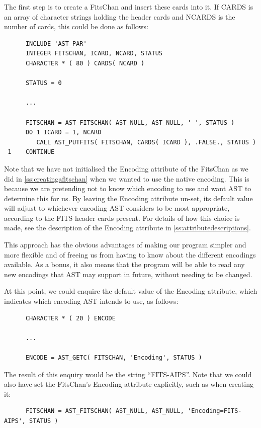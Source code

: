 \documentclass[twoside,11pt]{article}
\newcommand{\htmlref}[2]{#1}
\newcommand{\appref}[1]{Appendix~\ref{#1}}
\newcommand{\secref}[1]{\S\ref{#1}}
\renewcommand{\appref}[1]{\ref{#1}}
\renewcommand{\secref}[1]{\ref{#1}}
\begin{document}
The first step is to create a \htmlref{FitsChan}{FitsChan} and insert these cards into
it. If CARDS is an array of character strings holding the header cards
and NCARDS is the number of cards, this could be done as follows:

\small
\begin{verbatim}
      INCLUDE 'AST_PAR'
      INTEGER FITSCHAN, ICARD, NCARD, STATUS
      CHARACTER * ( 80 ) CARDS( NCARD )

      STATUS = 0

      ...

      FITSCHAN = AST_FITSCHAN( AST_NULL, AST_NULL, ' ', STATUS )
      DO 1 ICARD = 1, NCARD
         CALL AST_PUTFITS( FITSCHAN, CARDS( ICARD ), .FALSE., STATUS )
 1    CONTINUE
\end{verbatim}
\normalsize

Note that we have not initialised the \htmlref{Encoding}{Encoding} attribute of the
FitsChan as we did in \secref{ss:creatingafitschan} when we wanted to
use the native encoding. This is because we are pretending not to know
which encoding to use and want AST to determine this for us. By
leaving the Encoding attribute un-set, its default value will adjust
to whichever encoding AST considers to be most appropriate, according
to the FITS header cards present. For details of how this choice is
made, see the description of the Encoding attribute in
\appref{ss:attributedescriptions}.

This approach has the obvious advantages of making our program simpler
and more flexible and of freeing us from having to know about the
different encodings available. As a bonus, it also means that the
program will be able to read any new encodings that AST may support in
future, without needing to be changed.

At this point, we could enquire the default value of the Encoding
attribute, which indicates which encoding AST intends to use, as
follows:

\small
\begin{verbatim}
      CHARACTER * ( 20 ) ENCODE

      ...

      ENCODE = AST_GETC( FITSCHAN, 'Encoding', STATUS )
\end{verbatim}
\normalsize

The result of this enquiry would be the string ``FITS-AIPS''.  Note
that we could also have set the FitsChan's Encoding attribute
explicitly, such as when creating it:

\small
\begin{verbatim}
      FITSCHAN = AST_FITSCHAN( AST_NULL, AST_NULL, 'Encoding=FITS-AIPS', STATUS )
\end{verbatim}
\normalsize
\end{document}
